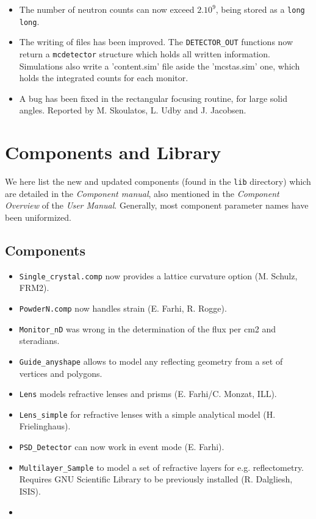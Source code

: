 \begin{itemize}
\item The number of neutron counts can now exceed $2.10^9$, being stored as a \verb+long long+.
\item The writing of files has been improved. The \verb+DETECTOR_OUT+ functions now return a \verb+mcdetector+ structure which holds all written information. Simulations also write a 'content.sim' file aside the 'mcstas.sim' one, which holds the integrated counts for each monitor.
\item A bug has been fixed in the rectangular focusing routine, for large solid angles. Reported by M. Skoulatos, L. Udby and J. Jacobsen.
\end{itemize}

\section{Components and Library}
\label{s:new-features:components}
 
We here list the new and updated components (found in the \MCS \verb+lib+ directory)
which are detailed in the {\it Component manual}, also mentioned in
the {\it Component Overview} of the {\it User Manual}. Generally, most component parameter names have been uniformized.

\subsection{Components}
\begin{itemize}
\item \verb+Single_crystal.comp+ now provides a lattice curvature option (M. Schulz, FRM2).
\item \verb+PowderN.comp+ now handles strain (E. Farhi, R. Rogge).
\item \verb+Monitor_nD+ was wrong in the determination of the flux per cm2 and steradians.
\item \verb+Guide_anyshape+ allows to model any reflecting geometry from a set of vertices and polygons.
\item \verb+Lens+ models refractive lenses and prisms (E. Farhi/C. Monzat, ILL).
\item \verb+Lens_simple+ for refractive lenses with a simple analytical model (H. Frielinghaus).
\item \verb+PSD_Detector+ can now work in event mode (E. Farhi).
\item \verb+Multilayer_Sample+ to model a set of refractive layers for e.g. reflectometry. Requires GNU Scientific Library to be previously installed (R. Dalgliesh, ISIS).
\item 
\end{itemize}

